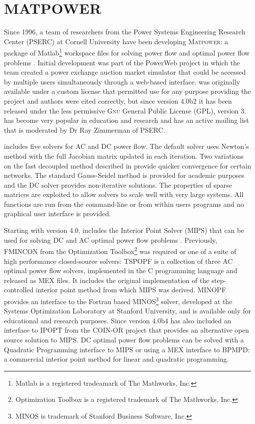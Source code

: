 \section{MATPOWER}
Since 1996, a team of researchers from the Power Systems Engineering Research
Center (PSERC) at Cornell University have been developing \textsc{Matpower}: a
package of Matlab\footnote{Matlab is a registered tradeamark of The Mathworks,
Inc.} workspace files for solving power flow and optimal power flow problems
\cite{zimmerman:mp_pes}. Initial development was part of the PowerWeb project in
which the team created a power exchange auction market simulator that could be
accessed by multiple users simultaneously through a web-based interface.
\matpower was originally available under a custom license that permitted use for
any purpose providing the project and authors were cited correctly, but since
version 4.0b2 it has been released under the less permissive \textsc{Gnu} General Public
License (GPL), version 3. \matpower has become very popular in education and
research and has an active mailing list that is moderated by Dr Ray Zimmerman of PSERC.

\matpower includes five solvers for AC and DC power flow.  The
default solver uses Newton's method \cite{tinney:67} with the full Jacobian
matrix updated in each iteration.  Two variations on the fast decoupled method
\cite{stott:74} described in  provide quicker convergence
for certain networks.  The standard Gauss-Seidel method \cite{glimn:57} is provided
for academic purposes and the DC solver provides non-iterative
solutions.  The properties of \matlab sparse matrices are exploited to
allow solvers to scale well with very large systems.  All functions are run
from the \matlab command-line or from within users programs and no graphical
user interface is provided.

Starting with version 4.0, \matpower includes the \matlab Interior Point Solver
(MIPS) that can be used for solving DC and AC optimal power flow problems
\cite{zimmerman:ccv}.  Previously, FMINCON from the \matlab Optimization
Toolbox\footnote{Optimization Toolbox is a registered trademark of The
Mathworks, Inc.} was required or one of a suite of high performance
closed-source solvers:  TSPOPF is a collection of three AC optimal power flow
solvers, implemented in the C programming language and released as \matlab MEX
files.  It includes the original implementation of the step-controlled interior
point method from which MIPS was derived.  MINOPF provides an interface to the
Fortran based MINOS\footnote{MINOS is trademark of Stanford Business Software,
Inc.} solver, developed at the Systems Optimization Laboratory at Stanford
University, and is available only for educational and research purposes. Since
version 4.0b4 \matpower has also included an interface to IPOPT from the COIN-OR
project that provides an alternative open source solution to MIPS.  DC optimal
power flow problems can be solved with a Quadratic Programming interface to MIPS
or using a MEX interface to BPMPD: a commercial interior point method for linear
and quadratic programming.

